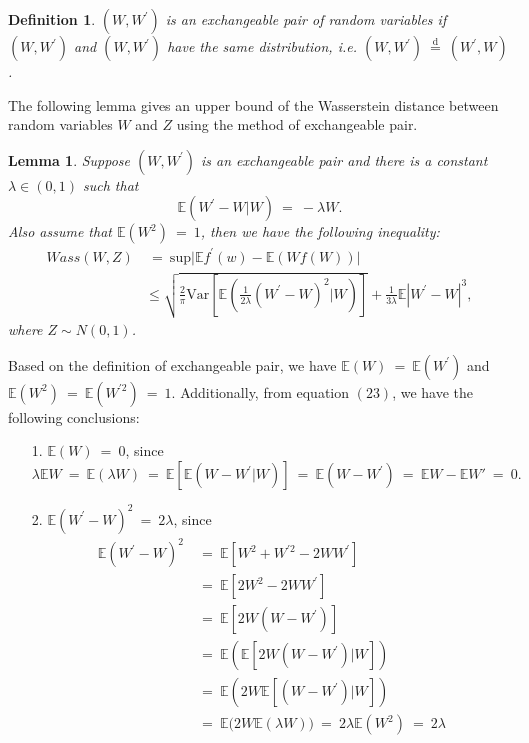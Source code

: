 \documentclass[12pt]{article}
\newcommand{\e}{\mathbb{E}}
\newcommand{\eq }{\: = \:}
\newtheorem{lemma}{Lemma}
\newtheorem{definition}{Definition}
\theoremstyle{nonumberplain}
\begin{document}
\begin{definition}
$(W,W^{\prime})$ is an exchangeable pair of random variables if $(W,W^{\prime})$ and $(W,W^{\prime})$ have the same distribution, i.e. $(W,W^{\prime})\overset{\text{d}}{\eq }(W^{\prime},W)$.
\end{definition}
The following lemma gives an upper bound of the Wasserstein distance between random variables $W$ and $Z$ using the method of exchangeable pair. 
\begin{lemma}
Suppose $(W,W^{\prime})$ is an exchangeable pair and there is a constant $\lambda \in (0,1)$ such that
\begin{equation}
\mathbb{E}(W^{\prime}-W|W)\eq -\lambda W.
\end{equation}
Also assume that $\mathbb{E}(W^{2})\eq 1$, then we have the following inequality:
\begin{align*}
Wass(W,Z)&\eq \mathrm{sup}\bigl|\mathbb{E}f^{\prime}(w)-\mathbb{E}(Wf(W))\bigr|\\
&\leq \sqrt{\frac{2}{\pi} \mathrm{Var}[\mathbb{E}(\frac{1}{2\lambda}(W^{\prime}-W)^{2}|W)]}+\frac{1}{3\lambda} \mathbb{E}|W^{\prime}-W|^{3},
\end{align*}
where $Z\sim N(0,1)$. 
\end{lemma}
Based on the definition of exchangeable pair, we have $\mathbb{E}(W)\eq \mathbb{E}(W^{\prime})$ and $\mathbb{E}(W^{2})\eq \mathbb{E}(W^{\prime 2})\eq 1$. Additionally, from equation $(23)$, we have the following conclusions: 
\begin{itemize}
\item[1.] $\mathbb{E}(W)\eq 0$, since
$$
\lambda \e W \eq \mathbb{E}(\lambda W) \eq \mathbb{E}[\mathbb{E}(W-W^{\prime}|W)]\eq \mathbb{E}(W-W^{\prime})\eq \e W - \e W' \eq  0.
$$
\item[2.] $\mathbb{E}(W^{\prime}-W)^{2}\eq 2 \lambda$, since
\begin{align*}
\mathbb{E}(W^{\prime}-W)^{2}&\eq \mathbb{E}[W^{2}+W^{\prime 2}-2WW^{\prime}]\\
&\eq \mathbb{E}[2W^{2}-2WW^{\prime}]\\
&\eq \mathbb{E}[2W(W-W^{\prime})]\\
&\eq \mathbb{E}(\mathbb{E}[2W(W-W^{\prime})|W])\\
&\eq \mathbb{E}(2W\mathbb{E}[(W-W^{\prime})|W])\\
&\eq \mathbb{E}\bigl(2W\mathbb{E}(\lambda W)\bigr)\eq 2\lambda \mathbb{E}(W^{2})\eq 2\lambda
\end{align*}
\end{itemize}
\end{document}
